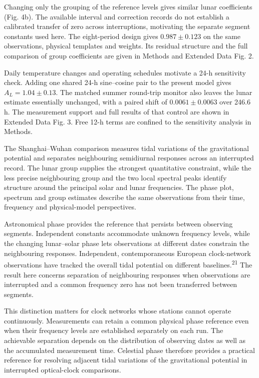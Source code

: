 \documentclass[
  10pt,
  a4paper,
]{article}
\begin{document}
Changing only the grouping of the reference levels gives similar lunar
coefficients (Fig. 4b). The available interval and correction records do
not establish a calibrated transfer of zero across interruptions,
motivating the separate segment constants used here. The eight-period
design gives \(0.987\pm0.123\) on the same observations, physical
templates and weights. Its residual structure and the full comparison of
group coefficients are given in Methods and Extended Data Fig. 2.

Daily temperature changes and operating schedules motivate a 24-h
sensitivity check. Adding one shared 24-h sine--cosine pair to the
present model gives \(A_L=1.04\pm0.13\). The matched summer round-trip
monitor also leaves the lunar estimate essentially unchanged, with a
paired shift of \(0.0061\pm0.0063\) over 246.6 h. The measurement
support and full results of that control are shown in Extended Data Fig.
3. Free 12-h terms are confined to the sensitivity analysis in Methods.

The Shanghai--Wuhan comparison measures tidal variations of the
gravitational potential and separates neighbouring semidiurnal responses
across an interrupted record. The lunar group supplies the strongest
quantitative constraint, while the less precise neighbouring group and
the two local spectral peaks identify structure around the principal
solar and lunar frequencies. The phase plot, spectrum and group
estimates describe the same observations from their time, frequency and
physical-model perspectives.

Astronomical phase provides the reference that persists between
observing segments. Independent constants accommodate unknown frequency
levels, while the changing lunar--solar phase lets observations at
different dates constrain the neighbouring responses. Independent,
contemporaneous European clock-network observations have tracked the
overall tidal potential on different baselines.\textsuperscript{21} The
result here concerns separation of neighbouring responses when
observations are interrupted and a common frequency zero has not been
transferred between segments.

This distinction matters for clock networks whose stations cannot
operate continuously. Measurements can retain a common physical phase
reference even when their frequency levels are established separately on
each run. The achievable separation depends on the distribution of
observing dates as well as the accumulated measurement time. Celestial
phase therefore provides a practical reference for resolving adjacent
tidal variations of the gravitational potential in interrupted
optical-clock comparisons.
\end{document}
